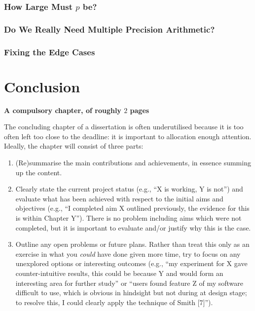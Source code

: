 \documentclass[ %
                    author={Dominic Joseph Moylett},
                    degree={MEng},
                     title={Dictionary Matching with Fingerprints},
                  subtitle={An Empirical Analysis},
                      type={Research},
                      year={2014} ]{dissertation}
\begin{document}
\subsection{How Large Must $p$ be?}

\subsection{Do We Really Need Multiple Precision Arithmetic?}

\subsection{Fixing the Edge Cases}


\chapter{Conclusion}
\label{chap:conclusion}

{\bf A compulsory chapter, of roughly $2$ pages} 
\vspace{1cm} 

\noindent
The concluding chapter of a dissertation is often underutilised because it 
is too often left too close to the deadline: it is important to allocation
enough attention.  Ideally, the chapter will consist of three parts:

\begin{enumerate}
\item (Re)summarise the main contributions and achievements, in essence
      summing up the content.
\item Clearly state the current project status (e.g., ``X is working, Y 
      is not'') and evaluate what has been achieved with respect to the 
      initial aims and objectives (e.g., ``I completed aim X outlined 
      previously, the evidence for this is within Chapter Y'').  There 
      is no problem including aims which were not completed, but it is 
      important to evaluate and/or justify why this is the case.
\item Outline any open problems or future plans.  Rather than treat this
      only as an exercise in what you {\em could} have done given more 
      time, try to focus on any unexplored options or interesting outcomes
      (e.g., ``my experiment for X gave counter-intuitive results, this 
      could be because Y and would form an interesting area for further 
      study'' or ``users found feature Z of my software difficult to use,
      which is obvious in hindsight but not during at design stage; to 
      resolve this, I could clearly apply the technique of Smith [7]'').
\end{enumerate}
\end{document}
